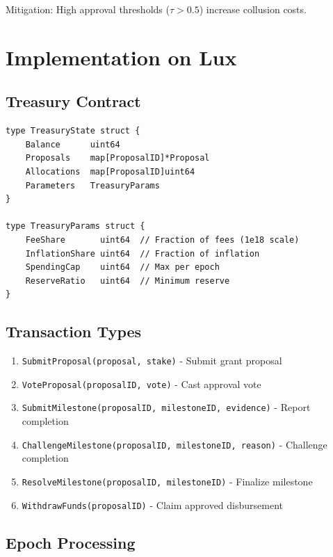 \documentclass[11pt,a4paper]{article}
\begin{document}
Mitigation: High approval thresholds ($\tau > 0.5$) increase collusion costs.

\section{Implementation on Lux}

\subsection{Treasury Contract}

\begin{verbatim}
type TreasuryState struct {
    Balance      uint64
    Proposals    map[ProposalID]*Proposal
    Allocations  map[ProposalID]uint64
    Parameters   TreasuryParams
}

type TreasuryParams struct {
    FeeShare       uint64  // Fraction of fees (1e18 scale)
    InflationShare uint64  // Fraction of inflation
    SpendingCap    uint64  // Max per epoch
    ReserveRatio   uint64  // Minimum reserve
}
\end{verbatim}

\subsection{Transaction Types}

\begin{enumerate}
    \item \texttt{SubmitProposal(proposal, stake)} - Submit grant proposal
    \item \texttt{VoteProposal(proposalID, vote)} - Cast approval vote
    \item \texttt{SubmitMilestone(proposalID, milestoneID, evidence)} - Report completion
    \item \texttt{ChallengeMilestone(proposalID, milestoneID, reason)} - Challenge completion
    \item \texttt{ResolveMilestone(proposalID, milestoneID)} - Finalize milestone
    \item \texttt{WithdrawFunds(proposalID)} - Claim approved disbursement
\end{enumerate}

\subsection{Epoch Processing}
\end{document}
